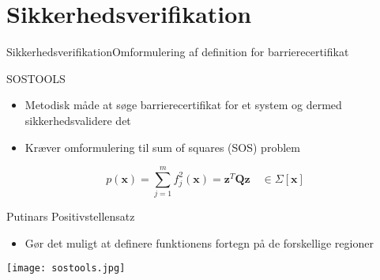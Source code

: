\section{Sikkerhedsverifikation}
\begin{frame}{Sikkerhedsverifikation}{Omformulering af definition for barrierecertifikat}
	\vspace{3mm}
\begin{block}{SOSTOOLS}
	\begin{itemize}
		\item Metodisk måde at søge barrierecertifikat for et system og dermed sikkerhedsvalidere det
		\item Kræver omformulering til sum of squares (SOS) problem
	\end{itemize}
\begin{equation*}
p(\mathbf{x})=\sum\limits_{j=1}^{m}f_j^2(\mathbf{x})=\mathbf{z}^T\mathbf{Q}\mathbf{z}\quad \in\Sigma[\mathbf{x}]
\end{equation*}
\end{block}
	\vspace{-8mm}
\begin{minipage}[b]{0.57\linewidth}
	\phantom{.}
	\vspace*{6mm}
\begin{block}{Putinars Positivstellensatz}
	\begin{itemize}
		\item Gør det muligt at definere funktionens fortegn på de forskellige regioner
	\end{itemize}
	\vspace{5mm}
\end{block}
\end{minipage}
\hspace{1mm}
\begin{minipage}[b]{0.35\linewidth}
	\vspace{3mm}
	\texttt{[image: sostools.jpg]}
\end{minipage}
\end{frame}


